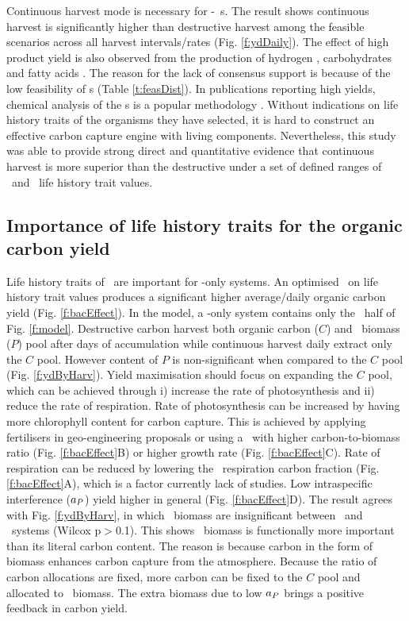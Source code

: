 \documentclass[../thesis.tex]{subfiles} %
\begin{document}
Continuous harvest mode is necessary for \phy-\bac\ \pbs s.  The result shows continuous harvest is significantly higher than destructive harvest among the feasible scenarios across all harvest intervals/rates (Fig. \ref{f:ydDaily}).  The effect of high product yield is also observed from the production of hydrogen \autocite{kim2008anaerobic}, carbohydrates \autocite{choix2012enhanced1,choix2012enhanced2} and fatty acids \autocite{leyva2014accumulation}.  The reason for the lack of consensus support is because of the low feasibility of \pbs s (Table \ref{t:feasDist}).  In publications reporting high yields, chemical analysis of the \pbs s is a popular methodology \autocite{santos2014microalgal,rivas2010interactions,leyva2014accumulation,amin2009photolysis}.  Without indications on life history traits of the organisms they have selected, it is hard to construct an effective carbon capture engine with living components.  Nevertheless, this study was able to provide strong direct and quantitative evidence that continuous harvest is more superior than the destructive under a set of defined ranges of \phy\ and \bac\ life history trait values.

\subsection{Importance of life history traits for the organic carbon yield}
Life history traits of \phy\ are important for \phy-only systems. An optimised \phy\ on life history trait values produces a significant higher average/daily organic carbon yield (Fig. \ref{f:bacEffect}).  In the model, a \phy-only system contains only the \phy\ half of Fig. \ref{f:model}.  Destructive carbon harvest both organic carbon ($C$) and \phy\ biomass ($P$) pool after days of accumulation while continuous harvest daily extract only the $C$ pool.  However content of $P$ is non-significant when compared to the $C$ pool (Fig. \ref{f:ydByHarv}).  Yield maximisation should focus on expanding the $C$ pool, which can be achieved through \Rn{1}) increase the rate of photosynthesis and \Rn{2}) reduce the rate of respiration.  Rate of photosynthesis can be increased by having more chlorophyll content for carbon capture.  This is achieved by applying fertilisers in geo-engineering proposals \autocite{gnanadesikan2008export,lawrence2014efficiency,trick2010iron,kwiatkowski2015atmospheric,lovelock2007ocean} or using a \phy\ with higher carbon-to-biomass ratio (Fig. \ref{f:bacEffect}B) or higher growth rate (Fig. \ref{f:bacEffect}C).  Rate of respiration can be reduced by lowering the \phy\ respiration carbon fraction (Fig. \ref{f:bacEffect}A), which is a factor currently lack of studies.  Low intraspecific interference ($a_P$) yield higher in general (Fig. \ref{f:bacEffect}D).  The result agrees with Fig. \ref{f:ydByHarv}, in which \phy\ biomass are insignificant between \PoH\ and \PoN\ systems (Wilcox p$>$0.1).  This shows \phy\ biomass is functionally more important than its literal carbon content.  The reason is because carbon in the form of biomass enhances carbon capture from the atmosphere.  Because the ratio of carbon allocations are fixed, more carbon can be fixed to the $C$ pool and allocated to \phy\ biomass.  The extra biomass due to low $a_P$ brings a positive feedback in carbon yield.
\end{document}
